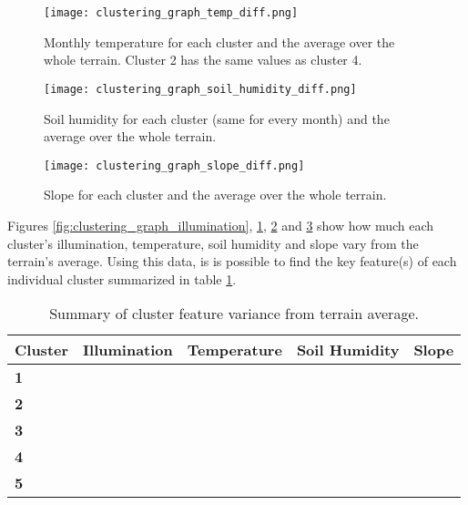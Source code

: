\begin{figure}
\center
	\texttt{[image: clustering\_graph\_temp\_diff.png]}
	\caption{ Monthly temperature for each cluster and the average over the whole terrain. Cluster 2 has the same values as cluster 4.}	
	\label{fig:clustering_graph_temp}
\end{figure}

\begin{figure}
\center
	\texttt{[image: clustering\_graph\_soil\_humidity\_diff.png]}
	\caption{ Soil humidity for each cluster (same for every month) and the average over the whole terrain.}	
	\label{fig:clustering_graph_humidity}
\end{figure}

\begin{figure}
\center
	\texttt{[image: clustering\_graph\_slope\_diff.png]}
	\caption{ Slope for each cluster and the average over the whole terrain.}	
	\label{fig:clustering_graph_slope}
\end{figure}

Figures \ref{fig:clustering_graph_illumination}, \ref{fig:clustering_graph_temp}, \ref{fig:clustering_graph_humidity} and \ref{fig:clustering_graph_slope} show how much each cluster's illumination, temperature, soil humidity and slope vary from the terrain's average. Using this data, is is possible to find the key feature(s) of each individual cluster summarized in table \ref{tab:clustering_test_cluster_variance}.

\begin{table}[]
  \centering
	    \begin{tabular}{|p{3cm}|p{3cm}|p{3cm}|p{3cm}|p{3cm}|}
		\hline	
  	    \textbf{Cluster} &  \textbf{Illumination} & \textbf{Temperature} & \textbf{Soil Humidity} & \textbf{Slope} \\
		\hline
		\textbf{1} & \textuparrow & \textdownarrow & \textrightarrow & \textdownarrow \textdownarrow \\
		\hline
		\textbf{2} & \textrightarrow & \textuparrow & \textrightarrow & \textuparrow \\
		\hline
		\textbf{3} & \textrightarrow & \textrightarrow & \textrightarrow & \textuparrow \textuparrow \textuparrow \\
		\hline
		\textbf{4} & \textdownarrow \textdownarrow & \textuparrow \textuparrow & \textuparrow \textuparrow \textuparrow & \textrightarrow \\
		\hline
		\textbf{5} & \textdownarrow & \textuparrow & \textdownarrow \textdownarrow & \textuparrow \\
		\hline
		\end{tabular}
		\caption{Summary of cluster feature variance from terrain average.}
	  \label{tab:clustering_test_cluster_variance}
\end{table}